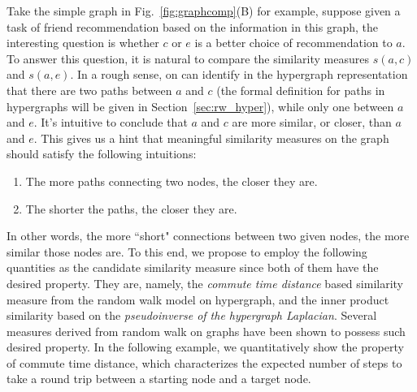 Take the simple graph in Fig.~\ref{fig:graphcomp}(B) for example, suppose given a task of friend recommendation based on the information in this graph, the interesting question is whether $c$ or $e$ is a better choice of recommendation to $a$. To answer this question, it is natural to compare the similarity measures $s(a, c)$ and $s(a, e)$. In a rough sense, on can identify in the hypergraph representation that there are two paths between $a$ and $c$ (the formal definition for paths in hypergraphs will be given in Section~\ref{sec:rw_hyper}), while only one between $a$ and $e$. It's intuitive to conclude that $a$ and $c$ are more similar, or closer, than $a$ and $e$. This gives us a hint that meaningful similarity measures on the graph should satisfy the following intuitions:
\begin{enumerate}
\item The more paths connecting two nodes, the closer they are.
\item The shorter the paths, the closer they are.
\end{enumerate}
In other words, the more ``short" connections between two given nodes, the more similar those nodes are.
To this end, we propose to employ the following quantities as the candidate similarity measure since both of them have the desired property. They are, namely, the \emph{commute time distance} based similarity measure from the random walk model on hypergraph, and the inner product similarity based on the \emph{pseudoinverse of the hypergraph Laplacian}.
Several measures derived from random walk on graphs have been shown to possess such desired property. In the following example, we quantitatively show the property of commute time distance, which characterizes the expected number of steps to take a round trip between a starting node and a target node.


